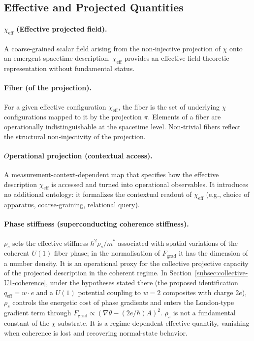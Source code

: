 \subsection{Effective and Projected Quantities}
  \label{subsec:effective-and-projected-quantities}

  \paragraph{\texorpdfstring{$\chi_{\mathrm{eff}}$}{χeff} (Effective projected field).}
    A coarse-grained scalar field arising from the non-injective projection of $\chi$
    onto an emergent spacetime description.
    $\chi_{\mathrm{eff}}$ provides an effective field-theoretic representation
    without fundamental status.

  \paragraph{Fiber (of the projection).}
    For a given effective configuration $\chi_{\mathrm{eff}}$, the fiber is the set of
    underlying $\chi$ configurations mapped to it by the projection $\pi$.
    Elements of a fiber are operationally indistinguishable at the spacetime level.
    Non-trivial fibers reflect the structural non-injectivity of the projection.

  \paragraph{\texorpdfstring{$O$} Operational projection (contextual access).}
    A measurement-context-dependent map that specifies how the effective description
    $\chi_{\mathrm{eff}}$ is accessed and turned into operational observables.
    It introduces no additional ontology: it formalizes the contextual readout of
    $\chi_{\mathrm{eff}}$ (e.g., choice of apparatus, coarse-graining, relational query).

  \paragraph[$\rho_s$]{Phase stiffness (superconducting coherence stiffness).}
    $\rho_s$ sets the effective stiffness $\hbar^2\rho_s/m^*$ associated with spatial variations of the coherent
    $U(1)$ fiber phase; in the normalisation of $F_{\mathrm{grad}}$ it has the dimension of a number density.
    It is an operational proxy for the collective projective capacity of the projected description in the coherent
    regime.
    In Section~\ref{subsec:collective-U1-coherence}, under the hypotheses stated there (the proposed identification
    $q_{\mathrm{eff}} = w \cdot e$ and a $U(1)$ potential coupling to $w=2$ composites with charge $2e$), $\rho_s$
    controls the energetic cost of phase gradients and enters the London-type gradient term through
    $F_{\mathrm{grad}} \propto (\nabla\theta - (2e/\hbar)A)^2$.
    $\rho_s$ is not a fundamental constant of the $\chi$ substrate.
    It is a regime-dependent effective quantity, vanishing when coherence is lost and recovering normal-state behavior.

